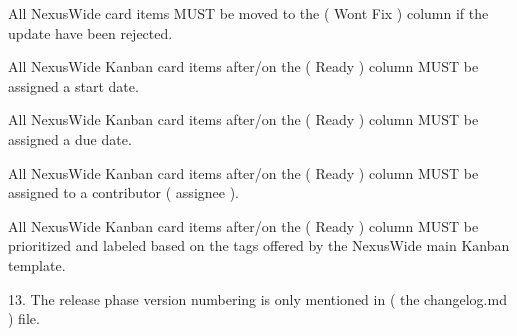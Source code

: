 \documentclass[13pt]{scrarticle}
\newcommand{\nexusrule}[1]{\Tribar[1][white][yellow][red]\color{blue} #1}
\begin{document}
      \nexusrule{ All NexusWide card items MUST be moved to the ( Wont Fix ) column if the update have been rejected.} \newline

      \nexusrule{ All NexusWide Kanban card items after/on the ( Ready ) column MUST be assigned a start date.} \newline

      \nexusrule{ All NexusWide Kanban card items after/on the ( Ready ) column MUST be assigned a due date.} \newline

      \nexusrule{ All NexusWide Kanban card items after/on the ( Ready ) column MUST be assigned to a contributor ( assignee ).} \newline

      \nexusrule{ All NexusWide Kanban card items after/on the ( Ready ) column MUST be prioritized and labeled based on the tags offered by the NexusWide main Kanban template.} \newline


    \nexusrule{    13. The release phase version numbering is only mentioned in ( the changelog.md ) file.
} \newline
\end{document}
